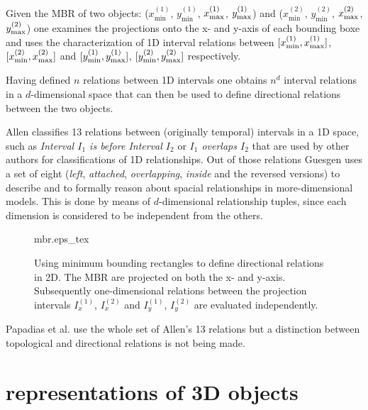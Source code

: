 \documentclass[paper=a4, fontsize=11pt]{scrartcl} %
\numberwithin{equation}{section} %
\numberwithin{figure}{section} %
\numberwithin{table}{section} %
\begin{document}
Given the MBR of two objects: ($x^{(1)}_{\mathrm{min}}$, $y^{(1)}_{\mathrm{min}}$, $x^{(1)}_{\vphantom{\mathrm{i}}\mathrm{max}}$, $y^{(1)}_{\vphantom{\mathrm{i}}\mathrm{max}}$) and ($x^{(2)}_{\mathrm{min}}$, $y^{(2)}_{\mathrm{min}}$, $x^{(2)}_{\vphantom{\mathrm{i}}\mathrm{max}}$, $y^{(2)}_{\vphantom{\mathrm{i}}\mathrm{max}}$) one examines the projections onto the x- and y-axis of each bounding boxe and uses the characterization of 1D interval relations between $[x^{(1)}_{\mathrm{min}}, x^{(1)}_{\vphantom{\mathrm{i}}\mathrm{max}}]$, $[x^{(2)}_{\mathrm{min}}, x^{(2)}_{\vphantom{\mathrm{i}}\mathrm{max}}]$ and $[y^{(1)}_{\mathrm{min}}, y^{(1)}_{\vphantom{\mathrm{i}}\mathrm{max}}]$, $[y^{(2)}_{\mathrm{min}}, y^{(2)}_{\vphantom{\mathrm{i}}\mathrm{max}}]$ respectively. 
 
Having defined $n$ relations between 1D intervals one obtains $n^d$ interval relations in a $d$-dimensional space that can then be used to define directional relations between the two objects. 

Allen \cite{Allen:1983:MKT:182.358434} classifies 13 relations between (originally temporal) intervals in a 1D space, such as \textit{Interval $I_1$ is before Interval $I_2$} or \textit{$I_1$ overlaps $I_2$} that are used by other authors for classifications of 1D relationships. Out of those relations Guesgen \cite{guesgen1989spatial} uses a set of eight (\emph{left}, \emph{attached}, \emph{overlapping}, \emph{inside} and the reversed versions) to describe and to formally reason about spacial relationships in more-dimensional models. This is done by means of $d$-dimensional relationship tuples, since each dimension is considered to be independent from the others.

\begin{figure}
  \centering
  \def\svgwidth{20em}
  {mbr.eps_tex}
  \caption{Using minimum bounding rectangles to define directional relations in 2D. The MBR are projected on both the x- and y-axis. Subsequently one-dimensional relations between the projection intervals $I^{(1)}_x$, $I^{(2)}_x$  and $I^{(1)}_y$, $I^{(2)}_y$ are evaluated independently.}
\label{fig:mbr}
\end{figure}


Papadias et al. \cite{papadias1995topological} use the whole set of Allen's 13 relations but a distinction between topological and directional relations is not being made. 




\section{representations of 3D objects}
\end{document}

